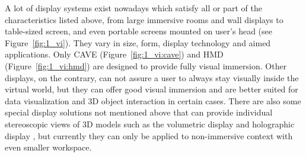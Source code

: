 A lot of display systems exist nowadays which satisfy all or part of the characteristics listed above, from large immersive rooms and wall displays to table-sized screen, and even portable screens mounted on user's head (see Figure~\ref{fig:1_vi}). They vary in size, form, display technology and aimed applications. Only CAVE (Figure~\ref{fig:1_vi:cave}) and HMD (Figure~\ref{fig:1_vi:hmd}) are designed to provide fully visual immersion. Other displays, on the contrary, can not assure a user to always stay visually inside the virtual world, but they can offer good visual immersion and are better suited for data visualization and 3D object interaction in certain cases. There are also some special display solutions not mentioned above that can provide individual stereoscopic views of 3D models such as the volumetric display \citep{Grossman2008Volum} and holographic display \citep{Lucente1997Holo}, but currently they can only be applied to non-immersive context with even smaller workspace.


